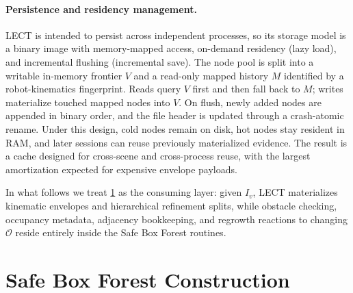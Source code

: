 \documentclass[journal]{IEEEtran}
\begin{document}
\paragraph{Persistence and residency management.}
LECT is intended to persist across independent processes, so its storage model
is a binary image with memory-mapped access, on-demand residency (lazy load),
and incremental flushing (incremental save). The node pool is split into a writable in-memory frontier
$V$ and a read-only mapped history $M$ identified by a robot-kinematics
fingerprint. Reads query $V$ first and then fall back to $M$; writes
materialize touched mapped nodes into $V$. On flush, newly added nodes are
appended in binary order, and the file header is updated through a crash-atomic
rename. Under this design, cold nodes remain on disk, hot nodes stay resident
in RAM, and later sessions can reuse previously materialized evidence. The
result is a cache designed for cross-scene and cross-process reuse, with the
largest amortization expected for expensive envelope payloads.

In what follows we treat \cref{sec:forest} as the consuming layer: given $I_v$, LECT
materializes kinematic envelopes and hierarchical refinement splits, while obstacle
checking, occupancy metadata, adjacency bookkeeping, and regrowth reactions to
changing $\mathcal{O}$ reside entirely inside the Safe Box Forest routines.

\section{Safe Box Forest Construction}\label{sec:forest}
\end{document}
